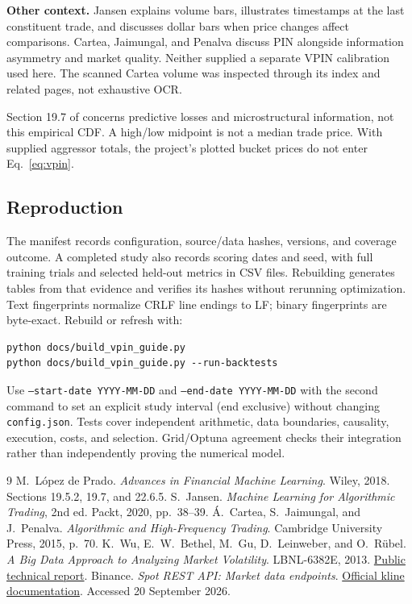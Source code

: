 \documentclass[10pt,a4paper]{article}
\begin{document}
\textbf{Other context.}
Jansen \cite[pp.~38--39]{jansen} explains volume bars, illustrates timestamps
at the last constituent trade, and discusses dollar bars when price changes
affect comparisons. Cartea, Jaimungal, and Penalva \cite[p.~70]{cartea}
discuss PIN alongside information asymmetry and market quality. Neither
supplied a separate VPIN calibration used here. The scanned Cartea volume
was inspected through its index and related pages, not exhaustive OCR.

Section 19.7 of \cite[pp.~295--296]{lopez} concerns predictive losses and
microstructural information, not this empirical CDF. A high/low midpoint is
not a median trade price. With supplied aggressor totals, the project's
plotted bucket prices do not enter Eq.~\eqref{eq:vpin}.

\subsection{Reproduction}
The manifest records configuration, source/data hashes, versions, and coverage
outcome. A completed study also records scoring dates and seed, with full
training trials and selected held-out metrics in CSV files. Rebuilding generates
tables from that evidence and verifies its hashes without rerunning optimization.
Text fingerprints normalize CRLF line endings to LF; binary fingerprints are byte-exact.
Rebuild or refresh with:
\begin{verbatim}
python docs/build_vpin_guide.py
python docs/build_vpin_guide.py --run-backtests
\end{verbatim}
Use \texttt{--start-date YYYY-MM-DD} and \texttt{--end-date YYYY-MM-DD}
with the second command to set an explicit study interval (end exclusive)
without changing \texttt{config.json}. Tests cover independent arithmetic, data boundaries,
causality, execution, costs, and selection. Grid/Optuna agreement checks their
integration rather than independently proving the numerical model.

\begin{thebibliography}{9}\small
{} M.~L\'opez de Prado. \emph{Advances in Financial Machine Learning}.
Wiley, 2018. Sections 19.5.2, 19.7, and 22.6.5.
 S.~Jansen. \emph{Machine Learning for Algorithmic Trading},
2nd ed. Packt, 2020, pp.~38--39.
 \'A.~Cartea, S.~Jaimungal, and J.~Penalva.
\emph{Algorithmic and High-Frequency Trading}. Cambridge University Press, 2015, p.~70.
 K.~Wu, E.~W.~Bethel, M.~Gu, D.~Leinweber, and O.~R\"ubel.
\emph{A Big Data Approach to Analyzing Market Volatility}. LBNL-6382E, 2013.
\href{https://sdm.lbl.gov/~kewu/ps/LBNL-6382E.pdf}{Public technical report}.
 Binance. \emph{Spot REST API: Market data endpoints}.
\href{https://developers.binance.com/docs/binance-spot-api-docs/rest-api/market-data-endpoints}{Official kline documentation}.
Accessed 20 September 2026.
\end{thebibliography}
\end{document}
